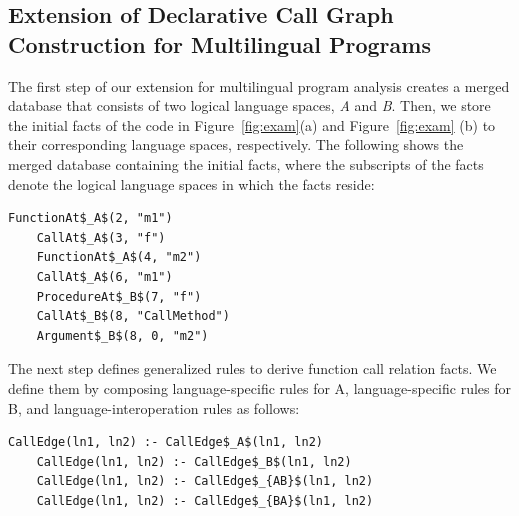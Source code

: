 %


\subsection{Extension of Declarative Call Graph Construction for Multilingual Programs}


The first step of our extension for multilingual program analysis creates a
merged database that consists of two logical language spaces, {\it A} and {\it
B}. Then, we store the initial facts of the code in Figure~\ref{fig:exam}(a) and
Figure~\ref{fig:exam} (b) to
their corresponding language spaces, respectively. The following shows the merged
database containing the initial facts, where the subscripts of the facts denote
the logical language spaces in which the facts reside: 

\begin{lstlisting}[style=mrule]
    FunctionAt$_A$(2, "m1")
    CallAt$_A$(3, "f")
    FunctionAt$_A$(4, "m2")
    CallAt$_A$(6, "m1")
    ProcedureAt$_B$(7, "f")
    CallAt$_B$(8, "CallMethod")
    Argument$_B$(8, 0, "m2")
\end{lstlisting}


The next step defines generalized rules to derive function call relation
facts. We define them by composing language-specific rules for A,
language-specific rules for B, and language-interoperation rules as follows:

\begin{lstlisting}[style=mrule]
    CallEdge(ln1, ln2) :- CallEdge$_A$(ln1, ln2)
    CallEdge(ln1, ln2) :- CallEdge$_B$(ln1, ln2)
    CallEdge(ln1, ln2) :- CallEdge$_{AB}$(ln1, ln2)
    CallEdge(ln1, ln2) :- CallEdge$_{BA}$(ln1, ln2)
\end{lstlisting}

